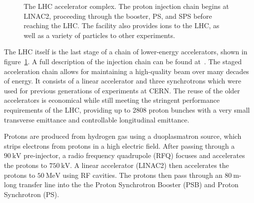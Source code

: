 \begin{figure}[htbp]
	\centering
	\caption{The LHC accelerator complex. The proton injection chain begins at LINAC2, proceeding through the booster, PS, and SPS before reaching the LHC. The facility also provides ions to the LHC, as well as a variety of particles to other experiments.}
	\label{fig:LHC-accelerator-complex}
\end{figure}


The LHC itself is the last stage of a chain of lower-energy accelerators, shown in figure~\ref{fig:LHC-accelerator-complex}. A full description of the injection chain can be found at~\cite{Benedikt:2004wm}. The staged acceleration chain allows for maintaining a high-quality beam over many decades of energy. It consists of a linear accelerator and three synchrotrons which were used for previous generations of experiments at CERN. The reuse of the older accelerators is economical while still meeting the stringent performance requirements of the LHC, providing up to 2808 proton bunches with a very small transverse emittance and controllable longitudinal emittance. 

Protons are produced from hydrogen gas using a duoplasmatron source, which strips electrons from protons in a high electric field. After passing through a $90~\mbox{kV}$ pre-injector, a radio frequency quadrupole (RFQ) focuses and accelerates the protons to $750~\mbox{kV}$. A linear accelerator (LINAC2) then accelerates the protons to $50~\mbox{MeV}$ using RF cavities. The protons then pass through an $80~\mbox{m}$-long transfer line into the the Proton Synchrotron Booster (PSB) and Proton Synchrotron (PS). 

